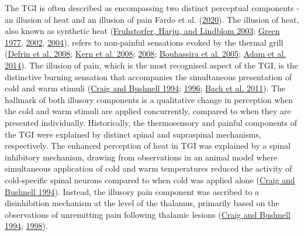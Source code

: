 \documentclass[
]{article}
\begin{document}
The TGI is often described as encompassing two distinct perceptual
components - an illusion of heat and an illusion of pain Fardo et al.
(\protect\hyperlink{ref-fardo_beyond_2020}{2020}). The illusion of heat,
also known as synthetic heat
(\protect\hyperlink{ref-fruhstorfer_significance_2003}{Fruhstorfer,
Harju, and Lindblom 2003};
\protect\hyperlink{ref-green_localization_1977}{Green 1977},
\protect\hyperlink{ref-green_synthetic_2002}{2002},
\protect\hyperlink{ref-green_temperature_2004}{2004}), refers to
non-painful sensations evoked by the thermal grill
(\protect\hyperlink{ref-defrin_spatial_2008}{Defrin et al. 2008};
\protect\hyperlink{ref-kern_pharmacological_2008}{Kern et al. 2008};
\protect\hyperlink{ref-kern_effects_2008}{2008};
\protect\hyperlink{ref-bouhassira_investigation_2005}{Bouhassira et al.
2005}; \protect\hyperlink{ref-adam_relationships_2014}{Adam et al.
2014}). The illusion of pain, which is the most recognised aspect of the
TGI, is the distinctive burning sensation that accompanies the
simultaneous presentation of cold and warm stimuli
(\protect\hyperlink{ref-craig_thermal_1994}{Craig and Bushnell 1994};
\protect\hyperlink{ref-craig_functional_1996}{1996};
\protect\hyperlink{ref-bach_thermal_2011}{Bach et al. 2011}). The
hallmark of both illusory components is a qualitative change in
perception when the cold and warm stimuli are applied concurrently,
compared to when they are presented individually. Historically, the
thermosensory and painful components of the TGI were explained by
distinct spinal and supraspinal mechanisms, respectively. The enhanced
perception of heat in TGI was explained by a spinal inhibitory
mechanism, drawing from observations in an animal model where
simultaneous application of cold and warm temperatures reduced the
activity of cold-specific spinal neurons compared to when cold was
applied alone (\protect\hyperlink{ref-craig_thermal_1994}{Craig and
Bushnell 1994}). Instead, the illusory pain component was ascribed to a
disinhibition mechanism at the level of the thalamus, primarily based on
the observations of unremitting pain following thalamic lesions
(\protect\hyperlink{ref-craig_thermal_1994}{Craig and Bushnell 1994};
\protect\hyperlink{ref-craig_new_1998}{1998}).
\end{document}
